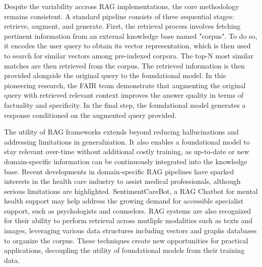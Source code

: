 \documentclass[12pt,twoside]{report}
\begin{document}
Despite the variability accross RAG implementations, the core methodology remains consistent. A standard pipeline consists of three sequential stages: retrieve, augment, and generate. First, the retrieval process involves fetching pertinent information from an external knowledge base named "corpus". To do so, it encodes the user query to obtain its vector representation, which is then used to search for similar vectors among pre-indexed corpora. The top-N most similar matches are then retrieved from the corpus. The retrieved information is then provided alongside the original query to the foundational model. In this pioneering research, the FAIR team demonstrate that augmenting the original query with retrieved relevant context improves the answer quality in terms of factuality and specificity. In the final step, the foundational model generates a response conditioned on the augmented query provided.

The utility of RAG frameworks extends beyond reducing hallucinations and addressing limitations in generalization. It also enables a foundational model to stay relevant over-time without additional costly training\cite{TrainingFrontierAICost}, as up-to-date or new domain-specific information can be continuously integrated into the knowledge base. Recent developments in domain-specific RAG pipelines have sparked interests in the health care industry to assist medical professionals, although serious limitations are highlighted\cite{RAGinHealthCare}. SentimentCareBot\cite{SentimentCareBot}, a RAG Chatbot for mental health support may help address the growing demand for accessible specialist support, such as psychologists and counselors.
RAG systems are also recognized for their ability to perform retrieval across mutliple modalities\cite{AskInAnyModality} such as texts and images, leveraging various data structures including vectors and graphs databases to organize the corpus. These techniques create new opportunities for practical applications, decoupling the utility of foundational models from their training data.
\end{document}
